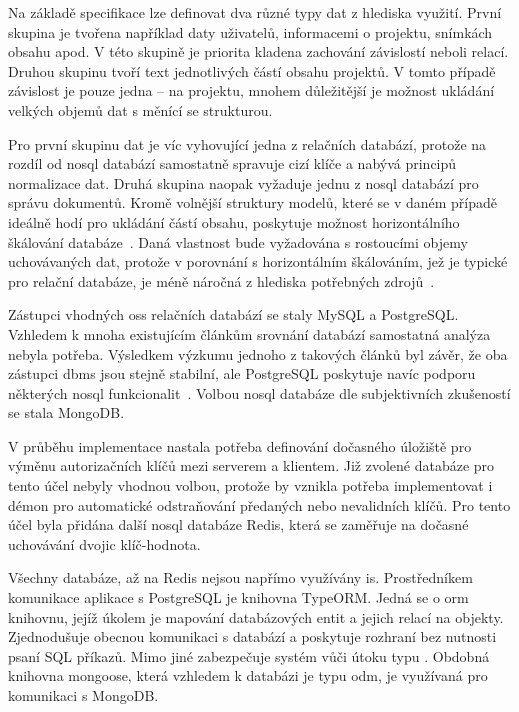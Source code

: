 Na základě specifikace lze definovat dva různé typy dat z hlediska využití. První skupina je tvořena například daty uživatelů, informacemi o projektu, snímkách obsahu apod. V této skupině je priorita kladena zachování závislostí neboli relací. Druhou skupinu tvoří text jednotlivých částí obsahu projektů. V tomto případě závislost je pouze jedna -- na projektu, mnohem důležitější je možnost ukládání velkých objemů dat s měnící se strukturou.

Pro první skupinu dat je víc vyhovující jedna z relačních databází, protože na rozdíl od \gls{nosql} databází samostatně spravuje cizí klíče a nabývá principů normalizace dat. Druhá skupina naopak vyžaduje jednu z \gls{nosql} databází pro správu dokumentů. Kromě volnější struktury modelů, které se v daném případě ideálně hodí pro ukládání částí obsahu, poskytuje možnost horizontálního škálování databáze~\cite{dbScaling}. Daná vlastnost bude vyžadována s rostoucími objemy uchovávaných dat, protože v porovnání s horizontálním škálováním, jež je typické pro relační databáze, je méně náročná z hlediska potřebných zdrojů~\cite{dbScaling}.


Zástupci vhodných \gls{oss} relačních databází se staly MySQL a PostgreSQL. Vzhledem k mnoha existujícím článkům srovnání databází samostatná analýza nebyla potřeba. Výsledkem výzkumu jednoho z takových článků byl závěr, že oba zástupci \gls{dbms} jsou stejně stabilní, ale PostgreSQL poskytuje navíc podporu některých \gls{nosql} funkcionalit~\cite{mysqlPostgres}. Volbou \gls{nosql} databáze dle subjektivních zkušeností se stala MongoDB.


V průběhu implementace nastala potřeba definování dočasného úložiště pro výměnu autorizačních klíčů mezi serverem a klientem. Již zvolené databáze pro tento účel nebyly vhodnou volbou, protože by vznikla potřeba implementovat i démon pro automatické odstraňování předaných nebo nevalidních klíčů. Pro tento účel byla přidána další \gls{nosql} databáze Redis, která se zaměřuje na dočasné uchovávání dvojic klíč-hodnota.


Všechny databáze, až na Redis nejsou napřímo využívány \gls{is}. Prostředníkem komunikace aplikace s PostgreSQL je knihovna TypeORM. Jedná se o \gls{orm} knihovnu, jejíž úkolem je mapování databázových entit a jejich relací na objekty. Zjednodušuje obecnou komunikaci s databází a poskytuje rozhraní bez nutnosti psaní SQL příkazů. Mimo jiné zabezpečuje systém vůči útoku typu . Obdobná knihovna mongoose, která vzhledem k databázi je typu \gls{odm}, je využívaná pro komunikaci s MongoDB.


